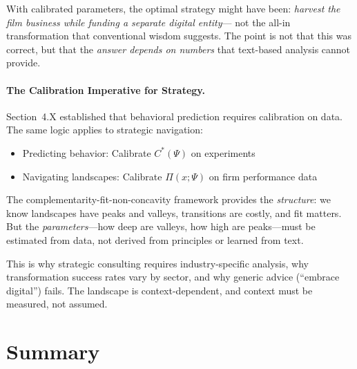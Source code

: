 With calibrated parameters, the optimal strategy might have been:
\emph{harvest the film business while funding a separate digital entity}---
not the all-in transformation that conventional wisdom suggests.
The point is not that this was correct, but that the \emph{answer depends on numbers}
that text-based analysis cannot provide.

\paragraph{The Calibration Imperative for Strategy.}
Section~4.X established that behavioral prediction requires calibration on data.
The same logic applies to strategic navigation:
\begin{itemize}
    \item Predicting behavior: Calibrate $C^*(\Psi)$ on experiments
    \item Navigating landscapes: Calibrate $\Pi(x; \Psi)$ on firm performance data
\end{itemize}

The complementarity-fit-non-concavity framework provides the \emph{structure}:
we know landscapes have peaks and valleys, transitions are costly, and fit matters.
But the \emph{parameters}---how deep are valleys, how high are peaks---must be
estimated from data, not derived from principles or learned from text.

This is why strategic consulting requires industry-specific analysis,
why transformation success rates vary by sector, and why generic advice
(``embrace digital'') fails. The landscape is context-dependent,
and context must be measured, not assumed.

\section{Summary}
\label{sec:ch7-summary}

